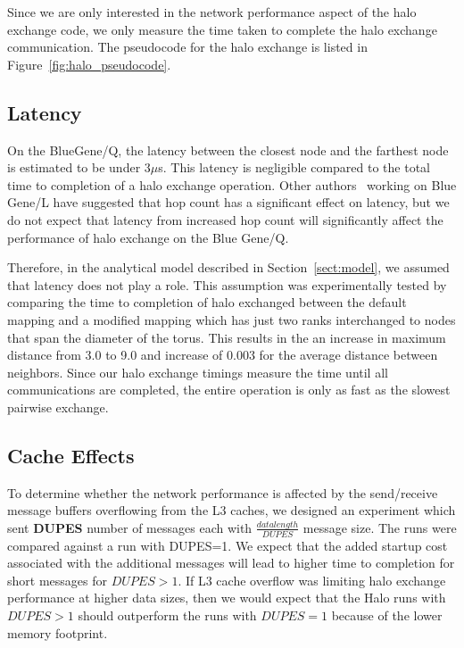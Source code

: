 \documentclass{acm_proc_article-sp}
\begin{document}
Since we are only interested in the network performance aspect of the halo exchange code, we only measure
the time taken to complete the halo exchange communication. The pseudocode for the halo exchange is listed in Figure~\ref{fig:halo_pseudocode}.

\subsection{Latency}
On the BlueGene/Q, the latency between the closest node and the farthest node is estimated to be under 3$\mu$s\cite{BGQ_Interconnect_2012,BGQ_RedBook_2013}.
This latency
is negligible compared to the total time to completion of a halo exchange operation. Other authors~\cite{Bhanot_2005} working on Blue Gene/L have suggested
that hop count has a significant effect on latency, but we do not expect
that latency from increased hop count will significantly affect the
performance of halo exchange on the Blue Gene/Q.

Therefore, in the analytical model described in Section~\ref{sect:model}, we assumed that latency does not play a role.
This assumption was experimentally tested by comparing the time to completion of halo exchanged between the default mapping and a modified
mapping which has just two ranks interchanged to nodes that span the diameter of the torus. 
This results in the an increase in maximum distance
from 3.0 to 9.0 and increase of 0.003 for the average distance between neighbors.
Since our halo exchange timings measure the time until all communications
are completed, the entire operation is only as fast as the slowest pairwise
exchange.

\subsection{Cache Effects}
To determine whether the network performance is affected by the send/receive message buffers overflowing from the
L3 caches, we designed an experiment which sent \textbf{DUPES} number of messages each with $\frac{datalength}{DUPES}$
message size. The runs were compared against a run with DUPES=1. 
We expect that the added startup cost associated with the
additional messages will lead to higher time to completion for short messages for
$DUPES>1$.
If L3 cache overflow was limiting halo exchange performance at higher data
sizes, then we would expect that the Halo runs with $DUPES>1$ should outperform
the runs with $DUPES=1$ because of the lower memory footprint.
\end{document}
